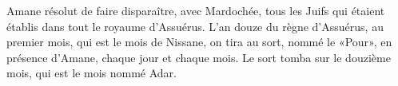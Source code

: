 Amane résolut de faire disparaître, avec Mardochée,
	tous les Juifs qui étaient établis dans tout le royaume d’Assuérus.
L’an douze du règne d’Assuérus, au premier mois, qui est le mois de Nissane,
	on tira au sort, nommé le «Pour», en présence d’Amane, chaque jour et chaque mois.
Le sort tomba sur le douzième mois, qui est le mois nommé Adar.
